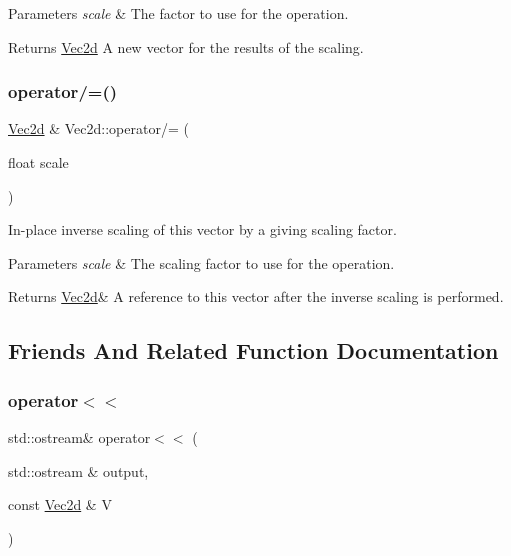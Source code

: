\begin{DoxyParams}{Parameters}
{\em scale} & The factor to use for the operation. \\
\hline
\end{DoxyParams}
\begin{DoxyReturn}{Returns}
\hyperlink{classVec2d}{Vec2d} A new vector for the results of the scaling. 
\end{DoxyReturn}
\mbox{\label{classVec2d_a99a52f2bea702660693f73fe0fb3c12c}} 
\subsubsection{\texorpdfstring{operator/=()}{operator/=()}}
{\footnotesize\ttfamily \hyperlink{classVec2d}{Vec2d} \& Vec2d\+::operator/= (\begin{DoxyParamCaption}\item[{float}]{scale }\end{DoxyParamCaption})}



In-\/place inverse scaling of this vector by a giving scaling factor. 


\begin{DoxyParams}{Parameters}
{\em scale} & The scaling factor to use for the operation. \\
\hline
\end{DoxyParams}
\begin{DoxyReturn}{Returns}
\hyperlink{classVec2d}{Vec2d}\& A reference to this vector after the inverse scaling is performed. 
\end{DoxyReturn}


\subsection{Friends And Related Function Documentation}
\mbox{\label{classVec2d_a99f75efb61cca535cfd09970b7010180}} 
\subsubsection{\texorpdfstring{operator$<$$<$}{operator<<}}
{\footnotesize\ttfamily std\+::ostream\& operator$<$$<$ (\begin{DoxyParamCaption}\item[{std\+::ostream \&}]{output,  }\item[{const \hyperlink{classVec2d}{Vec2d} \&}]{V }\end{DoxyParamCaption})\hspace{0.3cm}{\ttfamily [friend]}}



